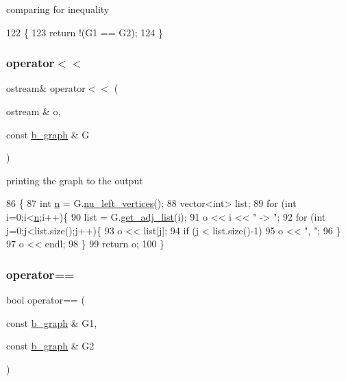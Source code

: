 comparing for inequality 


\begin{DoxyCode}
122 \{
123   \textcolor{keywordflow}{return} !(G1 == G2);
124 \}
\end{DoxyCode}
\mbox{\label{classb__graph_a0635d59bf5b2d1df3d3dd2beef14ac6e}} 
\subsubsection{\texorpdfstring{operator$<$$<$}{operator<<}}
{\footnotesize\ttfamily ostream\& operator$<$$<$ (\begin{DoxyParamCaption}\item[{ostream \&}]{o,  }\item[{const \hyperlink{classb__graph}{b\+\_\+graph} \&}]{G }\end{DoxyParamCaption})\hspace{0.3cm}{\ttfamily [friend]}}



printing the graph to the output 


\begin{DoxyCode}
86 \{
87   \textcolor{keywordtype}{int} \hyperlink{classb__graph_a9e211d40c1799bc9b125de472ff06642}{n} = G.\hyperlink{classb__graph_a5e71d5c97f2501b0b93c17146cf7e68e}{nu\_left\_vertices}();
88   vector<int> list;
89   \textcolor{keywordflow}{for} (\textcolor{keywordtype}{int} i=0;i<\hyperlink{classb__graph_a9e211d40c1799bc9b125de472ff06642}{n};i++)\{
90     list = G.\hyperlink{classb__graph_aa81c7179b9c6cb4986c4b41e84a85799}{get\_adj\_list}(i);
91     o << i << \textcolor{stringliteral}{" -> "};
92     \textcolor{keywordflow}{for} (\textcolor{keywordtype}{int} j=0;j<list.size();j++)\{
93       o << list[j];
94       \textcolor{keywordflow}{if} (j < list.size()-1)
95         o << \textcolor{stringliteral}{", "};
96     \}
97     o << endl;
98   \}
99   \textcolor{keywordflow}{return} o;
100 \}
\end{DoxyCode}
\mbox{\label{classb__graph_adf87735e8372a81049b347b1fdd23484}} 
\subsubsection{\texorpdfstring{operator==}{operator==}}
{\footnotesize\ttfamily bool operator== (\begin{DoxyParamCaption}\item[{const \hyperlink{classb__graph}{b\+\_\+graph} \&}]{G1,  }\item[{const \hyperlink{classb__graph}{b\+\_\+graph} \&}]{G2 }\end{DoxyParamCaption})\hspace{0.3cm}{\ttfamily [friend]}}



